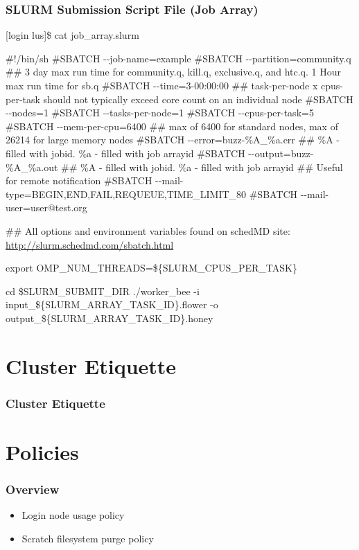\documentclass[t,hyperref={pdfpagelabels=false}]{beamer}
\newcommand{\ddash}{-{}-}
\begin{document}
\begin{frame}[fragile]
\frametitle{SLURM Submission Script File (Job Array)}
\begin{semiverbatim}\tiny
[login lus]\$ cat job_array.slurm

\#!/bin/sh
\#SBATCH \ddash{}job-name=example
\#SBATCH \ddash{}partition=community.q
\#\# 3 day max run time for community.q, kill.q, exclusive.q, and htc.q.  1 Hour max run time for sb.q
\#SBATCH \ddash{}time=3-00:00:00 
\#\# task-per-node x cpus-per-task should not typically exceed core count on an individual node 
\#SBATCH \ddash{}nodes=1
\#SBATCH \ddash{}tasks-per-node=1
\#SBATCH \ddash{}cpus-per-task=5
\#SBATCH \ddash{}mem-per-cpu=6400 \#\# max of 6400 for standard nodes, max of 26214 for large memory nodes                                                                                                                                               
\#SBATCH \ddash{}error=buzz-\%A\_\%a.err \#\# \%A - filled with jobid. \%a - filled with job arrayid
\#SBATCH \ddash{}output=buzz-\%A\_\%a.out \#\# \%A - filled with jobid. \%a - filled with job arrayid
\#\# Useful for remote notification
\#SBATCH \ddash{}mail-type=BEGIN,END,FAIL,REQUEUE,TIME\_LIMIT\_80
\#SBATCH \ddash{}mail-user=user@test.org

\#\# All options and environment variables found on schedMD site: \href{http://slurm.schedmd.com/sbatch.html}{http://slurm.schedmd.com/sbatch.html}

export OMP\_NUM\_THREADS=\$\{SLURM\_CPUS\_PER\_TASK\}

cd \$SLURM\_SUBMIT\_DIR
./worker\_bee -i input\_\$\{SLURM_ARRAY_TASK_ID\}.flower -o output\_\$\{SLURM_ARRAY_TASK_ID\}.honey
\end{semiverbatim}
\end{frame}


\section{Cluster Etiquette}
\begin{frame}
\frametitle{Cluster Etiquette}
\end{frame}



\section{Policies}
\begin{frame}
	\frametitle{Overview}
	\begin{itemize}
		\item Login node usage policy
		\item Scratch filesystem purge policy
	\end{itemize}
\end{frame}
\end{document}
